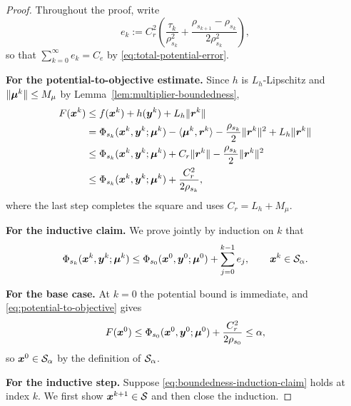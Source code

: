 \begin{proof}
Throughout the proof, write
\[
    e_k:=C_r^2\left(
        \frac{\tau_k}{\rho_{s_k}^2}
        +\frac{\rho_{s_{k+1}}-\rho_{s_k}}{2\rho_{s_k}^2}
    \right),
\]
so that $\sum_{k=0}^{\infty}e_k=C_e$ by \eqref{eq:total-potential-error}.

\textbf{For the potential-to-objective estimate.}
Since $h$ is $L_h$-Lipschitz and $\|\bm{\mu}^k\|\le M_\mu$ by
Lemma~\ref{lem:multiplier-boundedness},
\begin{equation}
\begin{aligned}
    F(\bm{x}^k)
    &\le f(\bm{x}^k)+h(\bm{y}^k)+L_h\|\bm{r}^k\|\\
    &=\Phi_{s_k}(\bm{x}^k,\bm{y}^k;\bm{\mu}^k)
      -\langle\bm{\mu}^k,\bm{r}^k\rangle
      -\frac{\rho_{s_k}}{2}\|\bm{r}^k\|^2
      +L_h\|\bm{r}^k\|\\
    &\le\Phi_{s_k}(\bm{x}^k,\bm{y}^k;\bm{\mu}^k)
      +C_r\|\bm{r}^k\|
      -\frac{\rho_{s_k}}{2}\|\bm{r}^k\|^2\\
    &\le\Phi_{s_k}(\bm{x}^k,\bm{y}^k;\bm{\mu}^k)
      +\frac{C_r^2}{2\rho_{s_k}},
\end{aligned}
\label{eq:potential-to-objective}
\end{equation}
where the last step completes the square and uses
$C_r=L_h+M_\mu$.

\textbf{For the inductive claim.}
We prove jointly by induction on $k$ that
\begin{equation}
    \Phi_{s_k}(\bm{x}^k,\bm{y}^k;\bm{\mu}^k)
    \le \Phi_{s_0}(\bm{x}^0,\bm{y}^0;\bm{\mu}^0)
       +\sum_{j=0}^{k-1}e_j,
    \qquad
    \bm{x}^k\in\mathcal{S}_\alpha.
    \label{eq:boundedness-induction-claim}
\end{equation}

\textbf{For the base case.}
At $k=0$ the potential bound is immediate, and
\eqref{eq:potential-to-objective} gives
\[
    F(\bm{x}^0)
    \le \Phi_{s_0}(\bm{x}^0,\bm{y}^0;\bm{\mu}^0)
       +\frac{C_r^2}{2\rho_{s_0}}
    \le\alpha,
\]
so $\bm{x}^0\in\mathcal{S}_\alpha$ by the definition of $\mathcal{S}_\alpha$.

\textbf{For the inductive step.}
Suppose \eqref{eq:boundedness-induction-claim} holds at index $k$.
We first show $\bm{x}^{k+1}\in\mathcal{S}$ and then close the induction.


\end{proof}
